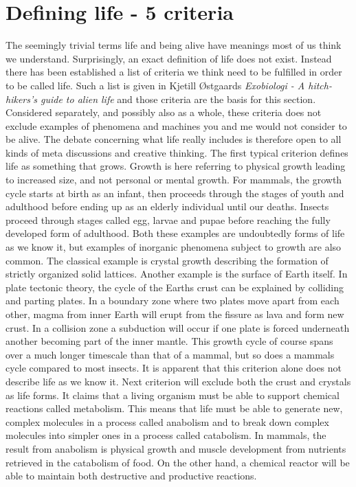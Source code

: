 \section{Defining life - 5 criteria}

The seemingly trivial terms life and being alive have meanings most of us think we understand. Surprisingly, an exact definition of life does not exist. Instead there has been established a list of criteria we think need to be fulfilled in order to be called life. Such a list is given in Kjetill \O stgaards \textit{Exobiologi - A hitch-hikers's guide to alien life} \cite{Ostgaard} and those criteria are the basis for this section. Considered separately, and possibly also as a whole, these criteria does not exclude examples of phenomena and machines you and me would not consider to be alive. The debate concerning what life really includes is therefore open to all kinds of meta
discussions and creative thinking.
The first typical criterion defines life as something that grows. Growth is here referring to physical growth leading to increased size, and not personal or mental growth. For mammals, the growth cycle starts at birth as an infant, then proceeds through the stages of youth and adulthood before ending up as an elderly individual until our deaths. Insects proceed through stages called egg, larvae and pupae before reaching the fully developed form of adulthood. Both these examples are undoubtedly forms of life as we know it, but examples of inorganic phenomena subject to growth are also common. The classical example is crystal growth describing the formation of strictly organized solid lattices. Another example is the surface of Earth itself. In plate tectonic theory, the cycle of the Earths crust can be explained by colliding and parting plates. In a boundary zone where two plates move apart from each other, magma from inner Earth will erupt from the fissure as lava and form new crust. In a collision zone a subduction will occur if one plate is forced underneath another becoming part of the inner mantle. This growth cycle of course spans over a much longer timescale than that of a mammal, but so does a mammals cycle compared to most insects. It is apparent that this criterion alone does not describe life as we know it.
Next criterion will exclude both the crust and crystals as life forms. It claims that a living organism must be able to support chemical reactions called metabolism. This means that life must be able to generate new, complex molecules in a process called anabolism and to break down complex molecules into simpler ones in a process called catabolism. In mammals, the result from anabolism is physical growth and muscle development from nutrients retrieved in the catabolism of food. On the other hand, a chemical reactor will be able to maintain both destructive and productive reactions.  

